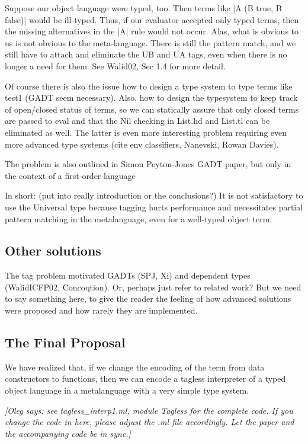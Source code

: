 \documentclass[preprint]{sigplanconf}
\newcommand{\oleg}[1]{{\it [Oleg says: #1]}}
\begin{document}
Suppose our object language were typed, too. Then terms like
|A (B true, B false)| would be ill-typed. Thus, if our evaluator
accepted only typed terms, then the missing alternatives in the |A|
rule would not occur. Alas, what is obvious to us is not obvious to
the meta-language. There is still the pattern match, and we still have
to attach and eliminate the UB and UA tags, even when there is no
longer a need for them. See Walid02, Sec 1.4 for more detail.

Of course there is also the issue how to design a type system to type
terms like test1 (GADT seem necessary). Also, how to design the
typesystem to keep track of open/closed status of terms, so we can
statically assure that only closed terms are passed to eval and that
the Nil checking in List.hd and List.tl can be eliminated as well. The
latter is even more interesting problem requiring even more advanced
type systems (cite env classifiers, Nanevski, Rowan Davies).

The problem is also outlined in Simon Peyton-Jones GADT paper, but
only in the context of a first-order language

In short: (put into really introduction or the conclusions?)
It is not satisfactory
to use the Universal type because tagging hurts performance and
necessitates partial pattern matching in the metalanguage, even for a
well-typed object term.  


\subsection{Other solutions}
The tag problem motivated GADTs (SPJ, Xi) and dependent types
(WalidICFP02, Concoqtion). Or, perhaps just refer to related work?
But we need to say something here, to give the reader the feeling of
how advanced solutions were proposed and how rarely they are implemented.


\subsection{The Final Proposal}
We have realized that, if we change the encoding of the term from data
constructors to functions, then we can encode a tagless interpreter of a
typed object language in a metalanguage with a very simple type system.

\oleg{see tagless\_interp1.ml, module Tagless for the complete code.
If you change the code in here, please adjust the .ml file
accordingly. Let the paper and the accompanying code be in sync.}
\end{document}
